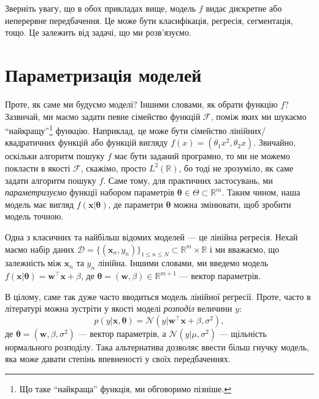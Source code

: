 \begin{remark}
	Зверніть увагу, що в обох прикладах вище, модель $f$ видає дискретне або
	неперервне передбачення. Це може бути класифікація, регресія, сегментація,
	тощо. Це залежить від задачі, що ми розв'язуємо.
\end{remark}

\section{Параметризація моделей}
Проте, як саме ми будуємо моделі? Іншими словами, як обрати функцію $f$?
Зазвичай, ми маємо задати певне сімейство функцій $\mathcal{F}$, поміж яких ми
шукаємо ``найкращу''\footnote{Що таке ``найкраща'' функція, ми обговоримо
пізніше.} функцію. Наприклад, це може бути сімейство лінійних/квадратичних
функцій або функцій вигляду $f(x) = (\theta_1x^2, \theta_2 x)$. Звичайно,
оскільки алгоритм пошуку $f$ має бути заданий програмно, то ми не можемо
покласти в якості $\mathcal{F}$, скажімо, просто $L^2(\mathbb{R})$, бо тоді не
зрозуміло, як саме задати алгоритм пошуку $f$. Саме тому, для практичних
застосувань, ми \textit{параметризуємо} функції набором параметрів
$\boldsymbol{\theta}\in \Theta \subset \mathbb{R}^m$. Таким чином, наша модель
має вигляд $f(\mathbf{x}|\boldsymbol{\theta})$, де параметри
$\boldsymbol{\theta}$ можна змінювати, щоб зробити модель точною.

\begin{example}
	Одна з класичних та найбільш відомих моделей --- це лінійна регресія. Нехай
	маємо набір даних $\mathcal{D} = \{(\mathbf{x}_n, y_n)\}_{1 \leq n \leq N}
	\subset \mathbb{R}^m \times \mathbb{R}$ і ми вважаємо, що залежність між
	$\mathbf{x}_n$ та $y_n$ лінійна. Іншими словами, ми введемо модель
	$f(\mathbf{x}|\boldsymbol{\theta}) = \boldsymbol{w}^{\top} \mathbf{x} +
	\beta$, де $\boldsymbol{\theta}=(\boldsymbol{w},\beta) \in \mathbb{R}^{m+1}$
	--- вектор параметрів. 

	В цілому, саме так дуже часто вводиться модель лінійної регресії. Проте, часто
	в літературі можна зустріти у якості моделі \textit{розподіл} величини $y$:
	\begin{equation}
		p(y|\mathbf{x},\boldsymbol{\theta}) = \mathcal{N}(y|\boldsymbol{w}^{\top}\mathbf{x} + \beta, \sigma^2),
	\end{equation}
	де $\boldsymbol{\theta} = (\boldsymbol{w},\beta,\sigma^2)$ --- вектор
	параметрів, а $\mathcal{N}(y|\mu,\sigma^2)$ --- щільність нормального
	розподілу. Така альтернатива дозволяє ввести більш гнучку модель, яка може
	давати степінь впевненості у своїх передбаченнях.
\end{example}


